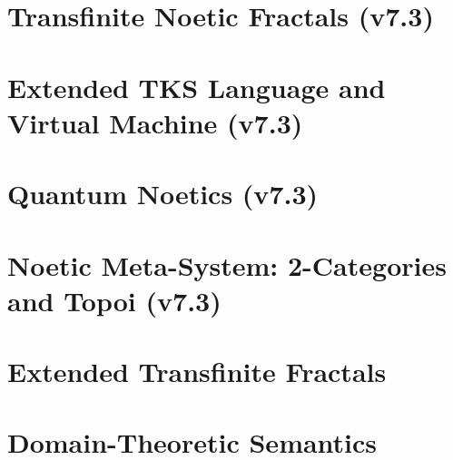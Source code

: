 \documentclass[11pt,twoside,openright]{book}
\theoremstyle{definition}
\theoremstyle{plain}
\theoremstyle{remark}
\begin{document}




\part{Transfinite Noetic Fractals (v7.3)}
\label{part:math-track-v73}


\part{Extended TKS Language and Virtual Machine (v7.3)}
\label{part:compiler-track-v73}


\part{Quantum Noetics (v7.3)}
\label{part:quantum-track-v73}


\part{Noetic Meta-System: 2-Categories and Topoi (v7.3)}
\label{part:meta-track-v73}


\part{Extended Transfinite Fractals}
\label{part:extended-fractals}



\part{Domain-Theoretic Semantics}
\label{part:domain-semantics}
\end{document}
